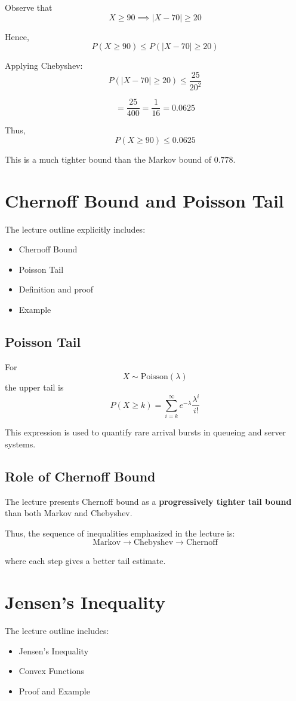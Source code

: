 \documentclass[12pt]{article}
\begin{document}
Observe that
\[
X\ge 90 \implies |X-70|\ge 20
\]

Hence,
\[
P(X\ge 90)\le P(|X-70|\ge 20)
\]

Applying Chebyshev:
\[
P(|X-70|\ge 20)\le \frac{25}{20^2}
\]

\[
=\frac{25}{400}=\frac{1}{16}=0.0625
\]

Thus,
\[
P(X\ge 90)\le 0.0625
\]

This is a much tighter bound than the Markov bound of \(0.778\).

\section{Chernoff Bound and Poisson Tail}

The lecture outline explicitly includes:
\begin{itemize}[leftmargin=1.5em]
    \item Chernoff Bound
    \item Poisson Tail
    \item Definition and proof
    \item Example
\end{itemize}

\subsection{Poisson Tail}
For
\[
X \sim \text{Poisson}(\lambda)
\]
the upper tail is
\[
P(X \ge k)=\sum_{i=k}^{\infty} e^{-\lambda}\frac{\lambda^i}{i!}
\]

This expression is used to quantify rare arrival bursts in queueing and server systems.

\subsection{Role of Chernoff Bound}
The lecture presents Chernoff bound as a \textbf{progressively tighter tail bound} than both Markov and Chebyshev.

Thus, the sequence of inequalities emphasized in the lecture is:
\[
\text{Markov} \rightarrow \text{Chebyshev} \rightarrow \text{Chernoff}
\]

where each step gives a better tail estimate.

\section{Jensen's Inequality}

The lecture outline includes:
\begin{itemize}[leftmargin=1.5em]
    \item Jensen’s Inequality
    \item Convex Functions
    \item Proof and Example
\end{itemize}
\end{document}

